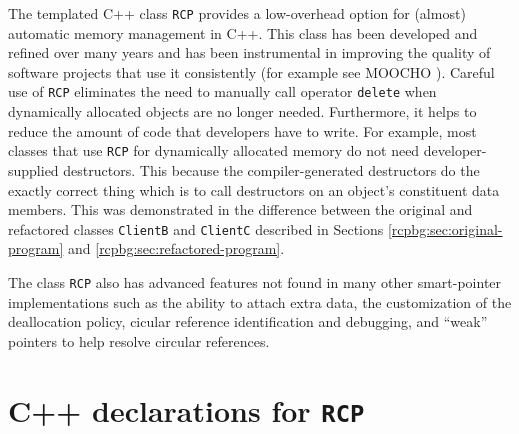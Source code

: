 \documentclass[pdf,ps2pdf,11pt]{SANDreport}
\begin{document}
The templated C++ class {}\texttt{RCP} provides a
low-overhead option for (almost) automatic memory management in C++.
This class has been developed and refined over many years and has been
instrumental in improving the quality of software projects that use it
consistently (for example see MOOCHO {}\cite{ref:moochouserguide}).
Careful use of {}\texttt{RCP} eliminates the need to
manually call operator {}\texttt{delete} when dynamically allocated
objects are no longer needed.  Furthermore, it helps to reduce the
amount of code that developers have to write.  For example, most
classes that use {}\texttt{RCP} for dynamically
allocated memory do not need developer-supplied destructors.  This
because the compiler-generated destructors do the exactly correct
thing which is to call destructors on an object's constituent data
members.  This was demonstrated in the difference between the original
and refactored classes {}\texttt{ClientB} and {}\texttt{ClientC}
described in Sections {}\ref{rcpbg:sec:original-program} and
{}\ref{rcpbg:sec:refactored-program}.

The class {}\texttt{RCP} also has advanced features not found in many
other smart-pointer implementations such as the ability to attach
extra data, the customization of the deallocation policy, cicular
reference identification and debugging, and ``weak'' pointers to help
resolve circular references.

%
\clearpage



%

\appendix

%
\section{C++ declarations for {}\texttt{RCP}}
\label{rcpqs:apdx:c++decl}
%
\end{document}
